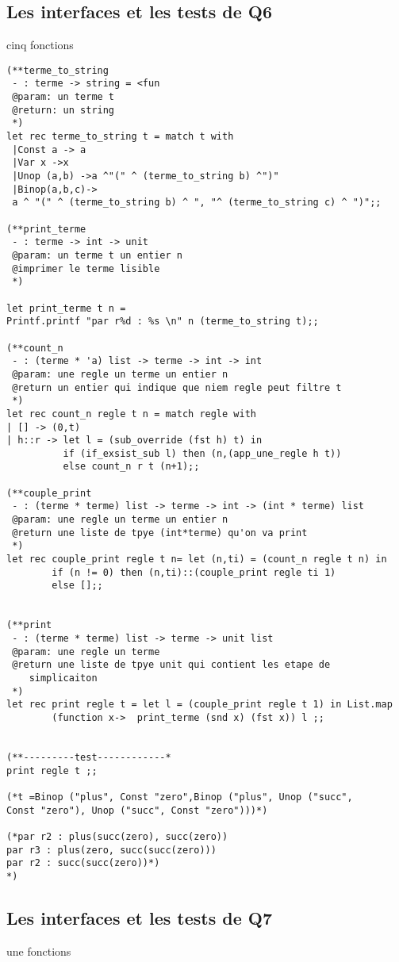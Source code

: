 \documentclass[12pt]{amsart}
\begin{document}
  \subsection{Les interfaces et les tests de Q6}  cinq fonctions
    \begin{lstlisting}
(**terme_to_string
 - : terme -> string = <fun
 @param: un terme t
 @return: un string
 *)
let rec terme_to_string t = match t with
 |Const a -> a
 |Var x ->x
 |Unop (a,b) ->a ^"(" ^ (terme_to_string b) ^")"
 |Binop(a,b,c)->
 a ^ "(" ^ (terme_to_string b) ^ ", "^ (terme_to_string c) ^ ")";; 

(**print_terme
 - : terme -> int -> unit 
 @param: un terme t un entier n
 @imprimer le terme lisible
 *)

let print_terme t n = 
Printf.printf "par r%d : %s \n" n (terme_to_string t);;

(**count_n
 - : (terme * 'a) list -> terme -> int -> int
 @param: une regle un terme un entier n
 @return un entier qui indique que niem regle peut filtre t
 *)
let rec count_n regle t n = match regle with
| [] -> (0,t)
| h::r -> let l = (sub_override (fst h) t) in 
          if (if_exsist_sub l) then (n,(app_une_regle h t)) 
          else count_n r t (n+1);;

(**couple_print
 - : (terme * terme) list -> terme -> int -> (int * terme) list
 @param: une regle un terme un entier n
 @return une liste de tpye (int*terme) qu'on va print 
 *)
let rec couple_print regle t n= let (n,ti) = (count_n regle t n) in  
        if (n != 0) then (n,ti)::(couple_print regle ti 1)
        else [];;


(**print
 - : (terme * terme) list -> terme -> unit list
 @param: une regle un terme 
 @return une liste de tpye unit qui contient les etape de 
    simplicaiton 
 *)
let rec print regle t = let l = (couple_print regle t 1) in List.map
        (function x->  print_terme (snd x) (fst x)) l ;;


(**---------test------------*
print regle t ;; 

(*t =Binop ("plus", Const "zero",Binop ("plus", Unop ("succ", 
Const "zero"), Unop ("succ", Const "zero")))*)

(*par r2 : plus(succ(zero), succ(zero)) 
par r3 : plus(zero, succ(succ(zero))) 
par r2 : succ(succ(zero))*)
*)
\end{lstlisting}


 
  
  \subsection{Les interfaces et les tests de Q7}   une fonctions
\end{document}
